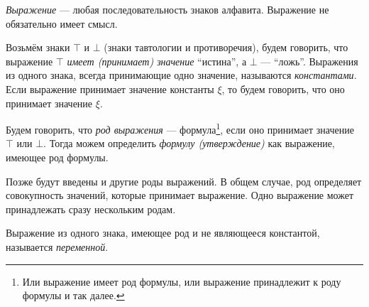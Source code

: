 {\it Выражение} --- любая последовательность знаков алфавита.
Выражение не обязательно имеет смысл.

Возьмём знаки $\top$ и $\bot$ (знаки тавтологии и противоречия),
будем говорить, что выражение $\top$ {\it имеет (принимает) значение} ``истина'',
а $\bot$ --- ``ложь''. Выражения из одного знака, всегда принимающие одно значение,
называются {\it константами}. Если выражение принимает значение константы $\xi$,
то будем говорить, что оно принимает значение $\xi$.

Будем говорить, что {\it род выражения} --- формула\footnote{
	Или выражение имеет род формулы, или выражение принадлежит к роду формулы и так далее.
}, если оно принимает значение $\top$
или $\bot$. Тогда можем определить {\it формулу (утверждение)} как выражение,
имеющее род формулы.

Позже будут введены и другие роды выражений. В общем случае, род определяет
совокупность значений, которые принимает выражение.
Одно выражение может принадлежать сразу нескольким родам.

Выражение из одного знака, имеющее род и не являющееся константой,
называется {\it переменной}.

